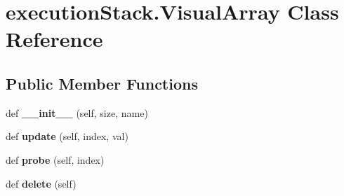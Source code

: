 \hypertarget{classexecution_stack_1_1_visual_array}{}\section{execution\+Stack.\+Visual\+Array Class Reference}
\label{classexecution_stack_1_1_visual_array}
\subsection*{Public Member Functions}
\begin{DoxyCompactItemize}
\item 
def {\bfseries \+\_\+\+\_\+init\+\_\+\+\_\+} (self, size, name)\hypertarget{classexecution_stack_1_1_visual_array_ad98c3e54817417c582a6244b73aa7dff}{}\label{classexecution_stack_1_1_visual_array_ad98c3e54817417c582a6244b73aa7dff}

\item 
def {\bfseries update} (self, index, val)\hypertarget{classexecution_stack_1_1_visual_array_a627f6a007e0ba27e135794ffcd19ed5a}{}\label{classexecution_stack_1_1_visual_array_a627f6a007e0ba27e135794ffcd19ed5a}

\item 
def {\bfseries probe} (self, index)\hypertarget{classexecution_stack_1_1_visual_array_adb38a0d313aa12b116095516798180f7}{}\label{classexecution_stack_1_1_visual_array_adb38a0d313aa12b116095516798180f7}

\item 
def {\bfseries delete} (self)\hypertarget{classexecution_stack_1_1_visual_array_ae62023d197eed6af549d467433b755f2}{}\label{classexecution_stack_1_1_visual_array_ae62023d197eed6af549d467433b755f2}

\end{DoxyCompactItemize}
